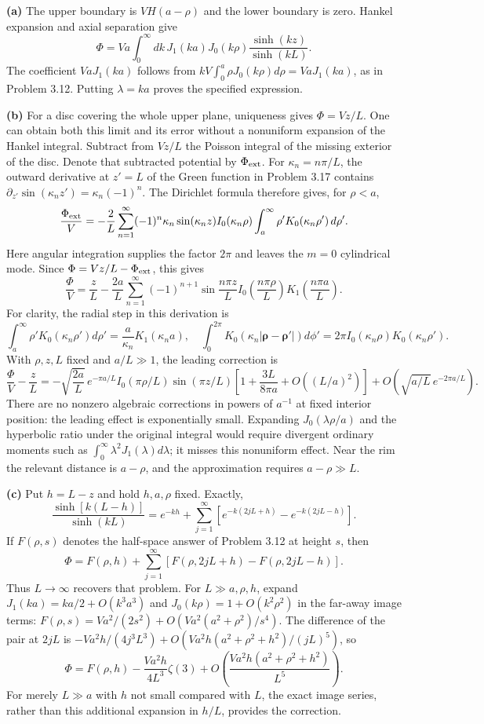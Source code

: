 \textbf{(a)} The upper boundary is $V H(a-\rho)$ and the lower
boundary is zero.  Hankel expansion and axial separation give
\[
\Phi=Va\int_0^\infty dk\,J_1(ka)J_0(k\rho)
\frac{\sinh(kz)}{\sinh(kL)}.
\]
The coefficient $VaJ_1(ka)$ follows from
$kV\int_0^a\rho J_0(k\rho)d\rho=VaJ_1(ka)$, as in Problem 3.12.
Putting $\lambda=ka$ proves the specified expression.

\textbf{(b)} For a disc covering the whole upper plane, uniqueness
gives $\Phi=Vz/L$.  One can obtain both this limit and its error
without a nonuniform expansion of the Hankel integral.  Subtract
from $Vz/L$ the Poisson integral of the missing exterior of the
disc.  Denote that subtracted potential by $\Phi_{\rm ext}$.
For $\kappa_n=n\pi/L$, the outward derivative at $z'=L$ of the
Green function in Problem 3.17 contains
$\partial_{z'}\sin(\kappa_nz')=\kappa_n(-1)^n$.
The Dirichlet formula therefore gives, for $\rho<a$,
\[
\frac{\Phi_{\rm ext}}V
=-\frac2L\sum_{n=1}^\infty(-1)^n\kappa_n\sin(\kappa_nz)
 I_0(\kappa_n\rho)\int_a^\infty \rho'K_0(\kappa_n\rho')\,d\rho'.
\]
Here angular integration supplies the factor $2\pi$ and leaves the
$m=0$ cylindrical mode.  Since $\Phi=Vz/L-\Phi_{\rm ext}$, this gives
\[
\boxed{\frac\Phi V=\frac zL-\frac{2a}{L}
\sum_{n=1}^\infty(-1)^{n+1}\sin\frac{n\pi z}{L}
 I_0\!\left(\frac{n\pi\rho}{L}\right)
 K_1\!\left(\frac{n\pi a}{L}\right).}
\]
For clarity, the radial step in this derivation is
\[
\int_a^\infty\rho'K_0(\kappa_n\rho')d\rho'
=\frac a{\kappa_n}K_1(\kappa_na),
\quad
\int_0^{2\pi}K_0(\kappa_n|\boldsymbol\rho-\boldsymbol\rho'|)d\phi'
=2\pi I_0(\kappa_n\rho)K_0(\kappa_n\rho').
\]
With $\rho,z,L$ fixed and $a/L\gg1$, the leading correction is
\[
\frac\Phi V-\frac zL
=-\sqrt{\frac{2a}{L}}\,e^{-\pi a/L}
 I_0(\pi\rho/L)\sin(\pi z/L)
\left[1+\frac{3L}{8\pi a}+O((L/a)^2)\right]
+O(\sqrt{a/L}\,e^{-2\pi a/L}).
\]
There are no nonzero algebraic corrections in powers of $a^{-1}$
at fixed interior position: the leading effect is exponentially
small.  Expanding $J_0(\lambda\rho/a)$ and the hyperbolic ratio
under the original integral would require divergent ordinary moments
such as $\int_0^\infty\lambda^2J_1(\lambda)d\lambda$; it misses this
nonuniform effect.  Near the rim the relevant distance is $a-\rho$,
and the approximation requires $a-\rho\gg L$.

\textbf{(c)} Put $h=L-z$ and hold $h,a,\rho$ fixed.  Exactly,
\[
\frac{\sinh[k(L-h)]}{\sinh(kL)}
=e^{-kh}+\sum_{j=1}^\infty
\left[e^{-k(2jL+h)}-e^{-k(2jL-h)}\right].
\]
If $F(\rho,s)$ denotes the half-space answer of Problem 3.12 at
height $s$, then
\[
\Phi=F(\rho,h)+\sum_{j=1}^\infty
[F(\rho,2jL+h)-F(\rho,2jL-h)].
\]
Thus $L\to\infty$ recovers that problem.  For $L\gg a,\rho,h$,
expand $J_1(ka)=ka/2+O(k^3a^3)$ and $J_0(k\rho)=1+O(k^2\rho^2)$
in the far-away image terms:
$F(\rho,s)=Va^2/(2s^2)+O(Va^2(a^2+\rho^2)/s^4)$.
The difference of the pair at $2jL$ is
$-Va^2h/(4j^3L^3)+O(Va^2h(a^2+\rho^2+h^2)/(jL)^5)$, so
\[
\boxed{\Phi=F(\rho,h)-\frac{Va^2h}{4L^3}\zeta(3)
+O\!\left(\frac{Va^2h(a^2+\rho^2+h^2)}{L^5}\right).}
\]
For merely $L\gg a$ with $h$ not small compared with $L$, the
exact image series, rather than this additional expansion in $h/L$,
provides the correction.

